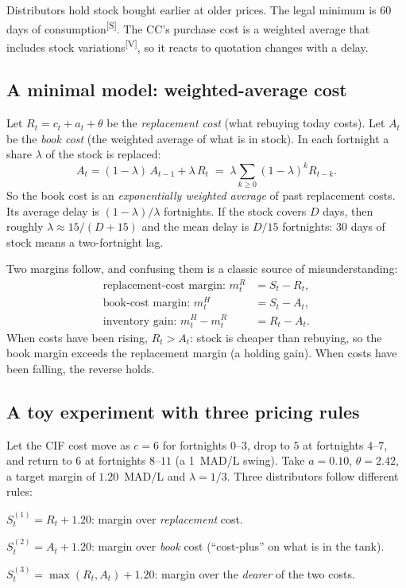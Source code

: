 \documentclass[11pt,a4paper]{article}
\newcommand{\tagV}{\textsuperscript{\textcolor{green!50!black}{\textsf{\scriptsize[V]}}}}
\newcommand{\tagS}{\textsuperscript{\textcolor{orange!80!black}{\textsf{\scriptsize[S]}}}}
\theoremstyle{definition}
\begin{document}
Distributors hold stock bought earlier at older prices. The legal minimum is 60 days of consumption\tagS. The CC's purchase cost is a
weighted average that includes stock variations\tagV, so it reacts to quotation changes with a delay.

\subsection{A minimal model: weighted-average cost}

Let $R_t = c_t + a_t + \theta$ be the \emph{replacement cost} (what rebuying today costs). Let $A_t$ be the \emph{book cost} (the weighted average
of what is in stock). In each fortnight a share $\lambda$ of the stock is replaced:
\begin{equation}\label{eq:wac}
A_t = (1-\lambda)\,A_{t-1} + \lambda\,R_t \;=\; \lambda\sum_{k\ge 0}(1-\lambda)^k R_{t-k}.
\end{equation}
So the book cost is an \emph{exponentially weighted average} of past replacement costs. Its average delay is $(1-\lambda)/\lambda$ fortnights. If the stock
covers $D$ days, then roughly $\lambda\approx 15/(D+15)$ and the mean delay is $D/15$ fortnights: 30 days of stock means a two-fortnight lag.

Two margins follow, and confusing them is a classic source of misunderstanding:
\begin{align}
\text{replacement-cost margin: } m^R_t &= S_t - R_t, \\
\text{book-cost margin: } m^H_t &= S_t - A_t, \\
\text{inventory gain: } m^H_t - m^R_t &= R_t - A_t .
\end{align}
When costs have been rising, $R_t > A_t$: stock is cheaper than rebuying, so the book margin exceeds the replacement margin (a holding gain).
When costs have been falling, the reverse holds.

\subsection{A toy experiment with three pricing rules}

Let the CIF cost move as $c=6$ for fortnights $0$--$3$, drop to $5$ at fortnights $4$--$7$, and return to $6$ at fortnights $8$--$11$
(a 1~MAD/L swing). Take $a=0.10$, $\theta=2.42$, a target margin of $1.20$~MAD/L and $\lambda=1/3$. Three distributors follow different rules:
\begin{description}[leftmargin=2em]
\item[Rule 1] $S^{(1)}_t = R_t + 1.20$: margin over \emph{replacement} cost.
\item[Rule 2] $S^{(2)}_t = A_t + 1.20$: margin over \emph{book} cost (``cost-plus'' on what is in the tank).
\item[Rule 3] $S^{(3)}_t = \max(R_t, A_t) + 1.20$: margin over the \emph{dearer} of the two costs.
\end{description}
\end{document}
